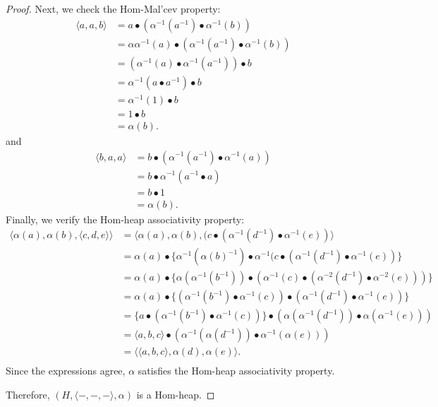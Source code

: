 \documentclass[14pt]{article}
\theoremstyle{Definition}
\theoremstyle{remark}
\begin{document}
\begin{proof}
Next, we check the Hom-Mal'cev property:
\begin{align*}
\langle a, a, b \rangle &= a \bullet(\alpha^{-1}( a^{-1}) \bullet \alpha
^{-1}(b))\\
&=\alpha\alpha^{-1}(a)\bullet(\alpha^{-1}( a^{-1}) \bullet \alpha
^{-1}(b))\\
&=(\alpha^{-1}(a)\bullet\alpha^{-1}(a^{-1}))\bullet b\\
&=\alpha^{-1}(a\bullet a^{-1})\bullet b\\
&=\alpha^{-1}(1)\bullet b\\
&=1\bullet b\\
&=\alpha(b). 
\end{align*}
and
\begin{align*}
\langle b,a,a\rangle&=b\bullet(\alpha^{-1}(a^{-1})\bullet\alpha^{-1}(a))\\
&=b\bullet \alpha^{-1}(a^{-1}\bullet a)\\
&=b\bullet 1\\
&=\alpha(b).
\end{align*}
Finally, we verify the Hom-heap associativity property:
\begin{align*}
\langle \alpha(a), \alpha(b), \langle c, d, e \rangle \rangle
&= \langle \alpha(a), \alpha(b), (c \bullet( \alpha
^{-1}(d^{-1}) \bullet \alpha^{-1} (e)) \rangle \\
&= \alpha(a) \bullet\{ \alpha^{-1}(\alpha(b)^{-1}) \bullet\alpha^{-1}(c \bullet( \alpha
^{-1}(d^{-1}) \bullet \alpha^{-1} (e)) \}\\
&= \alpha(a) \bullet\{ \alpha(\alpha^{-1}(b^{-1})) \bullet(\alpha^{-1}(c) \bullet( \alpha
^{-2}(d^{-1}) \bullet \alpha^{-2} (e))) \}\\
&= \alpha(a) \bullet\{ (\alpha^{-1}(b^{-1}) \bullet\alpha^{-1}(c)) \bullet( \alpha
^{-1}(d^{-1}) \bullet \alpha^{-1} (e)) \}\\
&=\{a \bullet(\alpha^{-1}(b^{-1}) \bullet\alpha^{-1}(c))\} \bullet( \alpha(\alpha
^{-1}(d^{-1})) \bullet \alpha(\alpha^{-1} (e))) \\
&=\langle a,b,c\rangle\bullet (\alpha^{-1}(\alpha(d^{-1}))\bullet\alpha^{-1}(\alpha(e)))\\
&=\langle\langle a,b,c\rangle,\alpha( d),\alpha( e)\rangle.\\
\end{align*}
Since the expressions agree, $\alpha$ satisfies the Hom-heap associativity property.

Therefore, $(H, \langle -,-,- \rangle, \alpha)$ is a Hom-heap.
\end{proof}
\end{document}
